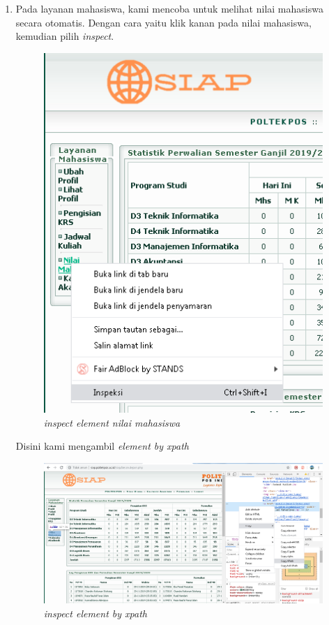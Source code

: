 \begin{enumerate}
\item Pada layanan mahasiswa, kami mencoba untuk melihat nilai mahasiswa secara otomatis. Dengan cara yaitu klik kanan pada nilai mahasiswa, kemudian pilih \textit{inspect}.
\begin{figure}[H]
    	\centering
    	\includegraphics[scale=0.5]{figures/nilai1.png}
    	\caption{\textit{inspect element nilai mahasiswa}}
    	\label{CLI}
	\end{figure}

\newpage

Disini kami mengambil \textit{element by xpath}
\begin{figure}[H]
    	\centering
    	\includegraphics[scale=0.3]{figures/nilai2.png}
    	\caption{\textit{inspect element by xpath}}
    	\label{CLI}
	\end{figure}
	

\end{enumerate}
